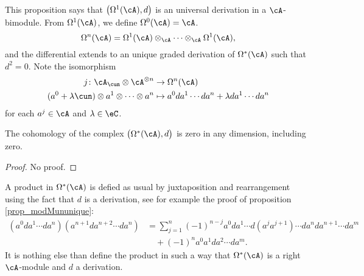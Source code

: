 This proposition says that $\big( \Omega^1(\cA),d \big)$ is an universal derivation in a $\cA$-bimodule. From $\Omega^1(\cA)$, we define $\Omega^0(\cA)=\cA$.
\[ 
  \Omega^n(\cA)=\Omega^1(\cA)\otimes_{\cA}\cdots\otimes_{\cA}\Omega^1(\cA),
\]
and the differential extends to an unique graded derivation of $\Omega^*(\cA)$ such that $d^2=0$. Note the isomorphism
\begin{equation}
\begin{aligned}
 j\colon \cA_{\cun}\otimes\cA^{\otimes n}&\to\Omega^n(\cA)  \\ 
(a^0+\lambda\cun)\otimes a^1\otimes\cdots\otimes a^{n}&\mapsto a^0da^1\cdots da^{n}+\lambda da^1\cdots da^{n} 
\end{aligned}
\end{equation}
for each $a^{j}\in\cA$ and $\lambda\in\eC$.

\begin{lemma}
The cohomology of the complex $\big( \Omega^*(\cA),d \big)$ is zero in any dimension, including zero.
\end{lemma}
\begin{proof}
No proof.
\end{proof}

A product in $\Omega^*(\cA)$ is defied as usual by juxtaposition and rearrangement using the fact that $d$ is a derivation, see for example the proof of proposition \ref{prop_modMununique}:
\[ 
\begin{split}
(a^0da^1\cdots da^{n})(a^{n+1}da^{n+2}\cdots da^{n})&=\sum_{j=1}^{n}(-1)^{n-j}a^0da^1\cdots d(a^{j}a^{j+1})\cdots da^{n}da^{n+1}\cdots da^m\\
					&\quad+(-1)^na^0a^1 da^2\cdots da^{m}.
\end{split}  
\]
It is nothing else than define the product in such a way that $\Omega^*(\cA)$ is a right $\cA$-module and $d$ a derivation.


